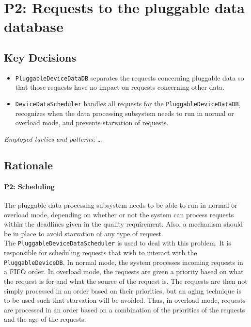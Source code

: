 \section{P2: Requests to the pluggable data database}

    \subsection*{Key Decisions}

        \begin{itemize}
            \item \texttt{PluggableDeviceDataDB} separates the requests concerning pluggable data
                  so that those requests have no impact on requests concerning other data.
        	\item \texttt{DeviceDataScheduler} handles all requests for the \texttt{PluggableDeviceDataDB},
                  recognizes when the data processing subsystem needs to run in normal or overload mode,
                  and prevents starvation of requests.
        \end{itemize}
        \emph{Employed tactics and patterns:} \ldots

    \subsection*{Rationale}
        \paragraph{P2: Scheduling}
            The pluggable data processing subsystem needs to be able to run in normal
            or overload mode, depending on whether or not the system can process
            requests within the deadlines given in the quality requirement. Also,
            a mechanism should be in place to avoid starvation of any type of request. \\
            The \texttt{PluggableDeviceDataScheduler} is used to deal with this problem.
            It is responsible for scheduling requests that wish to interact with
            the \texttt{PluggableDeviceDB}. In normal mode, the system processes
            incoming requests in a FIFO order. In overload mode, the requests are
            given a priority based on what the request is for and what the source
            of the request is. The requests are then not simply processed in an
            order based on their priorities, but an aging technique is to be used
            such that starvation will be avoided. Thus, in overload mode,
            requests are processed in an order based on a combination of the
            priorities of the requests and the age of the requests.

